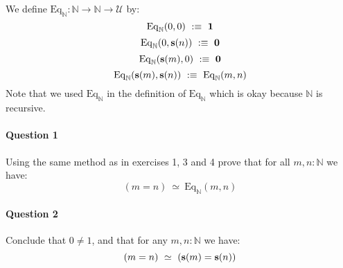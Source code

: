 \documentclass{article}[6pt]%
\newcommand{\U}{{\mathcal U}}
\renewcommand{\r}{\rightarrow}
\newcommand{\s}{\mathrm{\bf s}}
\newcommand{\one}{{\bf 1}}
\newcommand{\zero}{{\bf 0}}
\newcommand{\Eq}{\mathrm{Eq}}
\newcommand{\encode}{\mathrm{\bf encode}}
\newcommand{\decode}{\mathrm{\bf decode}}
\begin{document}
\begin{Exercise}[title={The natural numbers}]

We define $\Eq_{\mathbb{N}}: {\mathbb{N}} \r {\mathbb{N}} \r \U$ by:
\[\Eq_{\mathbb{N}}(0,0) \ :\equiv \ \one\]
\[\Eq_{\mathbb{N}}(0,\s(n)) \ :\equiv \ \zero\]
\[\Eq_{\mathbb{N}}(\s(m),0) \ :\equiv \ \zero\]
\[\Eq_{\mathbb{N}}(\s(m),\s(n)) \ :\equiv \ \Eq_{\mathbb{N}}(m,n)\]
Note that we used $\Eq_{\mathbb{N}}$ in the definition of $\Eq_{\mathbb{N}}$ which is okay because ${\mathbb{N}}$ is recursive. %

\paragraph{Question 1}
Using the same method as in exercises 1, 3 and 4 prove that for all $m,n:\mathbb{N}$ we have:
\[(m=n) \ \simeq\ \Eq_{\mathbb{N}}(m,n)\]

\paragraph{Question 2}
Conclude that $0\neq 1$, and that for any $m,n:{\mathbb{N}}$ we have:
\[(m=n)\ \simeq\ (\s(m)=\s(n))\]





\end{Exercise}
\end{document}
